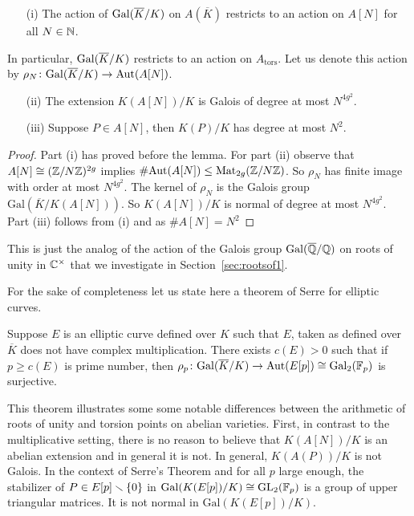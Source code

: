 \begin{lemma}\label{lem:galoisactionav}
  \begin{enumerate}
  \item [(i)]
    The
    action of $\mathrm{Gal}(\overline{K}/K)$ on $A(\overline K)$ restricts to an action on
    $A[N]$ for all $N\in{\mathbb{N}}$.
  \end{enumerate}
  In particular, $\mathrm{Gal}(\overline{K}/K)$ restricts to
  an action on $A_{\mathrm{tors}}$. 
  Let us denote this action by
  $\rho_N\colon \mathrm{Gal}(\overline{K}/K)\rightarrow \mathrm{Aut}(A[N])$.
  \begin{enumerate}
  \item[(ii)]
    The extension $K(A[N])/K$ is Galois
    of degree at most $N^{4g^2}$.
  \item[(iii)] Suppose $P\in A[N]$, then $K(P)/K$ has degree at most
    $N^2$. 
  \end{enumerate}
\end{lemma}
\begin{proof}
  Part (i) has proved before the lemma.  For part (ii) observe that
  $A[N]\cong
  ({\mathbb{Z}}/N{\mathbb{Z}})^{2g}$ implies
  $\#\mathrm{Aut}(A[N])\le \mathrm{Mat}_{2g}({{\mathbb{Z}}/N{\mathbb{Z}}})$.
  So  $\rho_N$ has finite image with order at most $N^{4g^2}$. The kernel
  of $\rho_N$ is the Galois group $\mathrm{Gal}(\overline K/K(A[N]))$.
  So $K(A[N])/K$ is normal of degree at most $N^{4g^2}$.
  Part (iii) follows from (i) and as $\#A[N]=N^2$  
\end{proof}

This is just the analog of the action of the Galois group $\mathrm{Gal}({\overline{\mathbb{Q}}}/{\mathbb{Q}})$
on roots of unity in ${\mathbb{C}}^\times$ that we investigate in
Section~\ref{sec:rootsof1}.


For the sake of completeness let us state here a theorem of Serre for
elliptic curves.

\begin{theorem}[Serre]
  Suppose $E$ is an elliptic curve defined over $K$ such that $E$,
  taken as defined over $\overline K$ does
  not have complex multiplication. There exists $c(E)>0$ such that
  if $p\ge c(E)$ is prime number, then $\rho_p \colon
  \mathrm{Gal}(\overline{K}/K)\rightarrow \mathrm{Aut}(E[p]) \cong \mathrm{Gal}_2({\mathbb{F}}_p)$
  is surjective.  
\end{theorem}

This theorem illustrates some some notable differences between the
arithmetic of roots of unity and torsion points on abelian varieties.
First, in contrast to the multiplicative setting, there is no reason
to believe that $K(A[N])/K$ is an abelian extension and in general it
is not. In general, $K(A(P))/K$ is not Galois. In the context of
Serre's Theorem and for all $p$ large enough, the stabilizer of $P \in
E[p] \smallsetminus\{0\}$ in $\mathrm{Gal}(K(E[p])/K)\cong \mathrm{GL}_2({\mathbb{F}}_p)$
is a group of upper triangular matrices. It is not normal in
$\mathrm{Gal}(K(E[p])/K)$.

